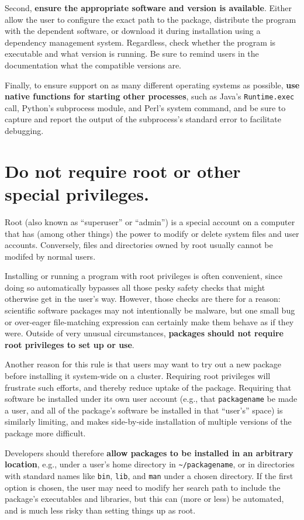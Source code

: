 \documentclass[10pt,letterpaper]{article}
\begin{document}
Second, \textbf{ensure the appropriate software and version is available}.
Either allow the user to
configure the exact path to the package, distribute the program with the
dependent software, or download it during installation using a
dependency management system. Regardless, check whether the program is
executable and what version is running. Be sure to remind users in the
documentation what the compatible versions are.

Finally, to ensure support on as many different operating systems as
possible, \textbf{use native functions for starting other processes}, such as
Java's \texttt{Runtime.exec} call, Python's subprocess module, and Perl's system
command, and be sure to capture and report the output of the subprocess's standard error
to facilitate debugging.

\section{Do not require root or other special privileges.}

Root (also known as ``superuser'' or ``admin'') is a special account on
a computer that has (among other things) the power to modify or delete
system files and user accounts. Conversely, files and directories owned
by root usually cannot be modifed by normal users.

Installing or running a program with root privileges is often
convenient, since doing so automatically bypasses all those pesky safety
checks that might otherwise get in the user's way. However, those checks
are there for a reason: scientific software packages may not
intentionally be malware, but one small bug or over-eager file-matching
expression can certainly make them behave as if they were. Outside of
very unusual circumstances,
\textbf{packages should not require root privileges to set up or use}.

Another reason for this rule is that users may want to try out a new
package before installing it system-wide on a cluster. Requiring root
privileges will frustrate such efforts, and thereby reduce uptake of the
package. Requiring that software be installed under its own user account
(e.g., that \texttt{packagename} be made a user, and all of the
package's software be installed in that ``user's'' space) is similarly
limiting, and makes side-by-side installation of multiple versions of
the package more difficult.

Developers should therefore
\textbf{allow packages to be installed in an arbitrary location},
e.g., under a user's home directory in
\texttt{\textasciitilde{}/packagename}, or in directories with standard
names like \texttt{bin}, \texttt{lib}, and \texttt{man} under a chosen
directory. If the first option is chosen, the user may need to modify
her search path to include the package's executables and libraries, but
this can (more or less) be automated, and is much less risky than
setting things up as root.
\end{document}
